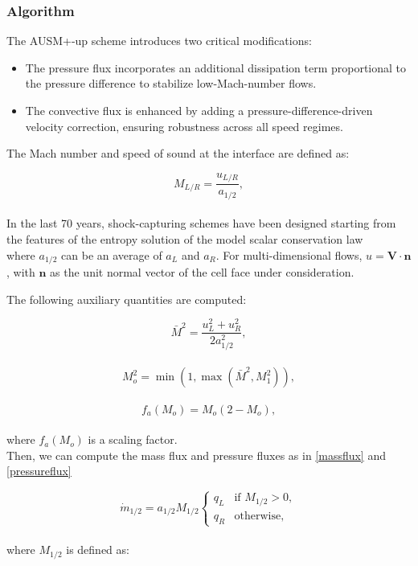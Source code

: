 \documentclass[a5paper]{sapthesis}
\begin{document}
	\subsubsection*{Algorithm}
	The AUSM+-up scheme introduces two critical modifications:
	
	\begin{itemize}
		\item The pressure flux incorporates an additional dissipation term proportional to the pressure difference to stabilize low-Mach-number flows.
		\item 	The convective flux is enhanced by adding a pressure-difference-driven velocity correction, ensuring robustness across all speed regimes.
	\end{itemize} 
	
	\noindent The Mach number and speed of sound at the interface are defined as:
	
	\begin{equation}
		M_{L/R} = \dfrac{u_{L/R}}{a_{1/2}},
	\end{equation}
	\\
	In the last 70 years, shock-capturing schemes have been designed starting from the features of the entropy solution of the model scalar conservation law
	\\
	where $a_{1/2}$ can be an average of $a_L$ and $a_R$. For multi-dimensional flows, $u = \mathbf{V} \cdot \mathbf{n}$, with $\mathbf{n}$ as the unit normal vector of the cell face under consideration.
	
	\noindent The following auxiliary quantities are computed:
	
	\begin{equation}
		\bar{M}^2 = \dfrac{u_L^2 + u_R^2}{2a_{1/2}^2},
	\end{equation}
	\\
	\begin{equation}
		M_o^2 = \min(1, \max(\bar{M}^2, M_1^2)),
	\end{equation}
	\\
	\begin{equation}
		f_a(M_o) = M_o (2 - M_o),
	\end{equation}
	\\
	where $f_a(M_o)$ is a scaling factor. \\
	
	\noindent Then, we can compute the mass flux and pressure fluxes as in \ref{massflux} and \ref{pressureflux}
	
	\begin{equation}
		\dot{m}_{1/2} = a_{1/2} M_{1/2} \begin{cases}
			q_L & \text{if } M_{1/2} > 0, \\
			q_R & \text{otherwise},
			\label{massflux}
		\end{cases}
	\end{equation}
	\\
	where $M_{1/2}$ is defined as:
	
\end{document}
